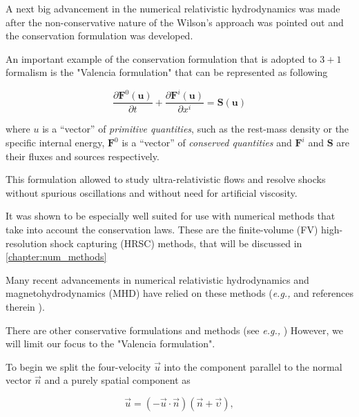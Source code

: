 A next big advancement in the numerical relativistic hydrodynamics was made after the non-conservative nature of the Wilson’s approach was pointed out \cite{Marti:1991wi} and the conservation formulation was developed. 

An important example of the conservation formulation that is adopted to $3 + 1$ formalism is the "Valencia formulation" \cite{Banyuls:1997} that can be represented as following

\begin{equation}
\frac{\partial\boldsymbol{F}^{0}(\boldsymbol{u})}{\partial t} + \frac{\partial\boldsymbol{F}^{i}(\boldsymbol{u})}{\partial x^{i}} = \boldsymbol{S}(\boldsymbol{u})
\label{eq:theory:valencia_formalism}
\end{equation}

where $u$ is a “vector” of \textit{primitive quantities}, such as the rest-mass density or the specific internal energy, $\boldsymbol{F}^0$ is a “vector” of \textit{conserved quantities} and $\boldsymbol{F}^i$ and $\boldsymbol{S}$ are their fluxes and sources respectively.

This formulation allowed to study ultra-relativistic flows and resolve shocks without spurious oscillations and without need for artificial viscosity.

It was shown to be especially well suited for use with numerical methods that take into account the conservation laws. 
These are the finite-volume (FV) high-resolution shock capturing (HRSC) methods, that will be discussed in  \ref{chapter:num_methods}

Many recent advancements in numerical relativistic hydrodynamics and magnetohydrodynamics (MHD) have relied on these methods (\textit{e.g.,} \cite{Giacomazzo:2010bx} \cite{Rezzolla:2011da} and references therein ).

There are other conservative formulations and methods (see \textit{e.g.,} \cite{Papadopoulos:1999kt})
However, we will limit our focus to the "Valencia formulation".

To begin we split the four-velocity $\vec{u}$ into the component parallel to the normal vector $\vec{n}$ and a purely spatial component as

\begin{equation}
\vec{u} = (-\vec{u} \cdot \vec{n})(\vec{n} + \vec{\upsilon}),
\end{equation}


